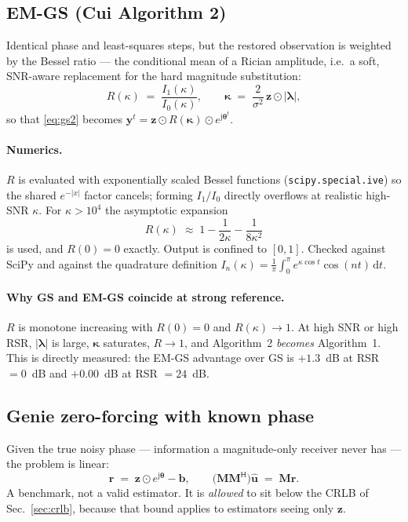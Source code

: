 \documentclass[11pt,a4paper]{article}
\newcommand{\herm}{\mathsf{H}}
\newcommand{\mat}[1]{\mathbf{#1}}
\newcommand{\vect}[1]{\mathbf{#1}}
\newcommand{\jj}{\mathrm{j}}
\begin{document}
\subsection{EM-GS (Cui Algorithm 2)}
Identical phase and least-squares steps, but the restored observation is
weighted by the Bessel ratio --- the conditional mean of a Rician amplitude,
i.e.\ a soft, SNR-aware replacement for the hard magnitude substitution:
\begin{equation}
R(\kappa) \;=\; \frac{I_1(\kappa)}{I_0(\kappa)},
\qquad
\boldsymbol{\kappa} \;=\; \frac{2}{\sigma^2}\,\vect{z}\odot|\boldsymbol{\lambda}| ,
\label{eq:bessel}
\end{equation}
so that \eqref{eq:gs2} becomes
$\vect{y}^{t}=\vect{z}\odot R(\boldsymbol{\kappa})\odot e^{\jj\boldsymbol{\theta}^t}$.

\paragraph{Numerics.} $R$ is evaluated with exponentially scaled Bessel
functions (\texttt{scipy.special.ive}) so the shared $e^{-|x|}$ factor
cancels; forming $I_1/I_0$ directly overflows at realistic high-SNR $\kappa$.
For $\kappa>10^4$ the asymptotic expansion
\begin{equation}
R(\kappa)\;\approx\;1-\frac{1}{2\kappa}-\frac{1}{8\kappa^2}
\label{eq:besselasym}
\end{equation}
is used, and $R(0)=0$ exactly. Output is confined to $[0,1]$. Checked against
SciPy and against the quadrature definition
$I_n(\kappa)=\frac1\pi\int_0^\pi e^{\kappa\cos t}\cos(nt)\,\mathrm{d}t$.

\paragraph{Why GS and EM-GS coincide at strong reference.} $R$ is monotone
increasing with $R(0)=0$ and $R(\kappa)\to1$. At high SNR or high RSR,
$|\boldsymbol{\lambda}|$ is large, $\boldsymbol{\kappa}$ saturates, $R\to1$,
and Algorithm~2 \emph{becomes} Algorithm~1. This is directly measured: the
EM-GS advantage over GS is $+1.3$~dB at RSR $=0$~dB and $+0.00$~dB at
RSR $=24$~dB.

\subsection{Genie zero-forcing with known phase}
Given the true noisy phase --- information a magnitude-only receiver never
has --- the problem is linear:
\begin{equation}
\vect{r} \;=\; \vect{z}\odot e^{\jj\boldsymbol{\theta}}-\vect{b},
\qquad
\bigl(\mat{M}\mat{M}^{\herm}\bigr)\hat{\vect{u}} \;=\; \mat{M}\vect{r} .
\label{eq:zf}
\end{equation}
A benchmark, not a valid estimator. It is \emph{allowed} to sit below the CRLB
of Sec.~\ref{sec:crlb}, because that bound applies to estimators seeing only
$\vect{z}$.
\end{document}
